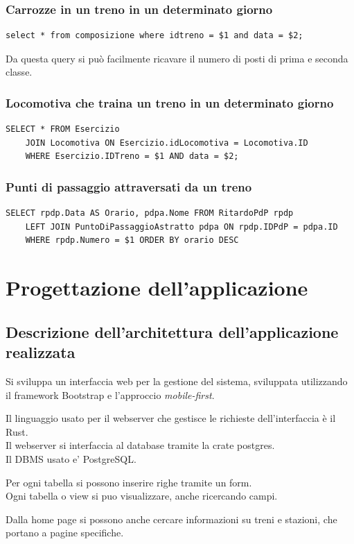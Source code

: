\documentclass[a4paper,12pt]{report}
\begin{document}
	\subsection{Carrozze in un treno in un determinato giorno}
	\begin{verbatim}
select * from composizione where idtreno = $1 and data = $2;
	\end{verbatim}
	\par Da questa query si può facilmente ricavare il numero di posti di prima e seconda classe.
	\subsection{Locomotiva che traina un treno in un determinato giorno}
	\begin{verbatim}
SELECT * FROM Esercizio
    JOIN Locomotiva ON Esercizio.idLocomotiva = Locomotiva.ID
    WHERE Esercizio.IDTreno = $1 AND data = $2;
	\end{verbatim}
	\subsection{Punti di passaggio attraversati da un treno}
	\begin{verbatim}
SELECT rpdp.Data AS Orario, pdpa.Nome FROM RitardoPdP rpdp
    LEFT JOIN PuntoDiPassaggioAstratto pdpa ON rpdp.IDPdP = pdpa.ID
    WHERE rpdp.Numero = $1 ORDER BY orario DESC
	\end{verbatim}
	\chapter{Progettazione dell'applicazione}
	\section{Descrizione dell'architettura dell'applicazione realizzata}
	\par Si sviluppa un interfaccia web per la gestione del sistema, sviluppata utilizzando il framework Bootstrap e l'approccio \textit{mobile-first}.
	\par Il linguaggio usato per il webserver che gestisce le richieste dell'interfaccia è il Rust.
	\\Il webserver si interfaccia al database tramite la crate postgres.
	\\Il DBMS usato e' PostgreSQL.
	\par Per ogni tabella si possono inserire righe tramite un form.
	\\Ogni tabella o view si puo visualizzare, anche ricercando campi.
	\par Dalla home page si possono anche cercare informazioni su treni e stazioni, che portano a pagine specifiche.
\end{document}
